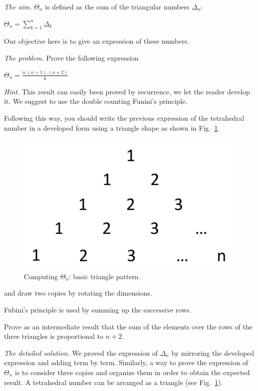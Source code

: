 \noindent \textit{The aim.}
$\Theta_n$ is defined as the sum of the triangular numbers $\Delta_n$:

$\Theta_n =  \sum_{k=1}^{n} \Delta_k$

Our objective here is to give an expression of these numbers.
\medskip

\noindent \textit{The problem.}
Prove the following expression

$\Theta_n = \frac{n.(n+1).(n+2)}{6}$
\medskip

\noindent \textit{Hint.}
This result can easily been proved by recurrence, we let the reader develop it. 
We suggest to use the double counting Funini's principle.

Following this way, you should write the previous expression of the tetrahedral number in a developed form 
using a triangle shape as shown in Fig.~\ref{fig:TetrahedralBasic}.
\begin{figure}[h]
\begin{center}
        \includegraphics[scale=0.5]{FiguresArithmetic/TetrahedralBasic}
        \caption{Computing $\Theta_n$: basic triangle pattern.}
        \label{fig:TetrahedralBasic}
\end{center}
\end{figure}
and draw two copies by rotating the dimensions.

Fubini's principle is used by summing up the successive rows.

Prove as an intermediate result that the sum of the elements over the rows of the three triangles is proportional to $n+2$.
\medskip

\noindent \textit{The detailed solution.}
We proved the expression of $\Delta_n$ by mirroring the developed expression and adding term by term.
Similarly, a way to prove the expression of $\Theta_n$ is to consider three copies and organize them 
in order to obtain the expected result.
A tetrahedral number can be arranged as a triangle (see Fig.~\ref{fig:TetrahedralBasic}).

